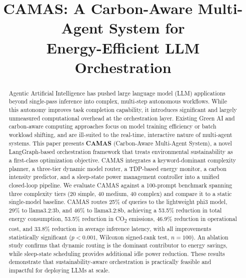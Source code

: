 \documentclass[journal]{IEEEtran}
\begin{document}
\title{CAMAS: A Carbon-Aware Multi-Agent System for\\
Energy-Efficient LLM Orchestration}

\author{
}

\maketitle

\begin{abstract}
Agentic Artificial Intelligence has pushed large language model (LLM)
applications beyond single-pass inference into complex, multi-step autonomous
workflows. While this autonomy improves task completion capability, it
introduces significant and largely unmeasured computational overhead at the
orchestration layer. Existing Green AI and carbon-aware computing approaches
focus on model training efficiency or batch workload shifting, and are
ill-suited to the real-time, interactive nature of multi-agent systems. This
paper presents \textbf{CAMAS} (Carbon-Aware Multi-Agent System), a novel
LangGraph-based orchestration framework that treats environmental sustainability
as a first-class optimization objective. CAMAS integrates a keyword-dominant
complexity planner, a three-tier dynamic model router, a TDP-based energy
monitor, a carbon intensity predictor, and a sleep-state power management
controller into a unified closed-loop pipeline. We evaluate CAMAS against a
100-prompt benchmark spanning three complexity tiers (20 simple, 40 medium, 40
complex) and compare it to a static single-model baseline. CAMAS routes 25\%
of queries to the lightweight phi3 model, 29\% to llama3.2:3b, and 46\% to
llama3.2:8b, achieving a 53.5\% reduction in total energy consumption, 53.5\%
reduction in CO\textsubscript{2} emissions, 46.9\% reduction in operational
cost, and 33.8\% reduction in average inference latency, with all improvements
statistically significant ($p < 0.001$, Wilcoxon signed-rank test, $n=100$).
An ablation study confirms that dynamic routing is the dominant contributor to
energy savings, while sleep-state scheduling provides additional idle power
reduction. These results demonstrate that sustainability-aware orchestration is
practically feasible and impactful for deploying LLMs at scale.
\end{abstract}
\end{document}
